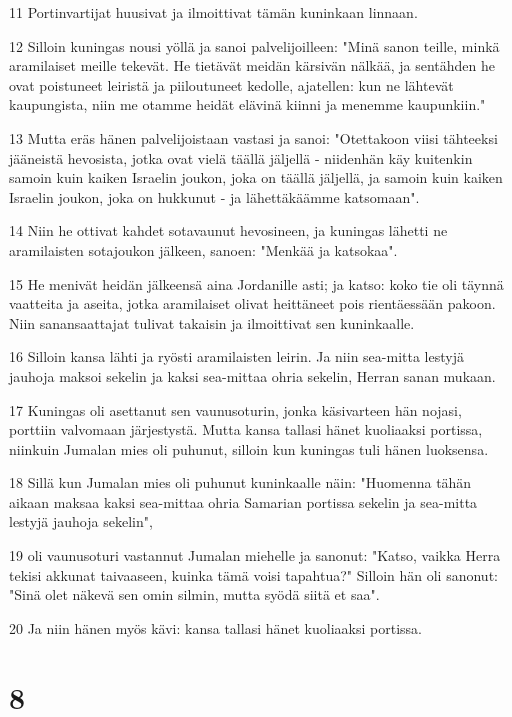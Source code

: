 \par 11 Portinvartijat huusivat ja ilmoittivat tämän kuninkaan linnaan.
\par 12 Silloin kuningas nousi yöllä ja sanoi palvelijoilleen: "Minä sanon teille, minkä aramilaiset meille tekevät. He tietävät meidän kärsivän nälkää, ja sentähden he ovat poistuneet leiristä ja piiloutuneet kedolle, ajatellen: kun ne lähtevät kaupungista, niin me otamme heidät elävinä kiinni ja menemme kaupunkiin."
\par 13 Mutta eräs hänen palvelijoistaan vastasi ja sanoi: "Otettakoon viisi tähteeksi jääneistä hevosista, jotka ovat vielä täällä jäljellä - niidenhän käy kuitenkin samoin kuin kaiken Israelin joukon, joka on täällä jäljellä, ja samoin kuin kaiken Israelin joukon, joka on hukkunut - ja lähettäkäämme katsomaan".
\par 14 Niin he ottivat kahdet sotavaunut hevosineen, ja kuningas lähetti ne aramilaisten sotajoukon jälkeen, sanoen: "Menkää ja katsokaa".
\par 15 He menivät heidän jälkeensä aina Jordanille asti; ja katso: koko tie oli täynnä vaatteita ja aseita, jotka aramilaiset olivat heittäneet pois rientäessään pakoon. Niin sanansaattajat tulivat takaisin ja ilmoittivat sen kuninkaalle.
\par 16 Silloin kansa lähti ja ryösti aramilaisten leirin. Ja niin sea-mitta lestyjä jauhoja maksoi sekelin ja kaksi sea-mittaa ohria sekelin, Herran sanan mukaan.
\par 17 Kuningas oli asettanut sen vaunusoturin, jonka käsivarteen hän nojasi, porttiin valvomaan järjestystä. Mutta kansa tallasi hänet kuoliaaksi portissa, niinkuin Jumalan mies oli puhunut, silloin kun kuningas tuli hänen luoksensa.
\par 18 Sillä kun Jumalan mies oli puhunut kuninkaalle näin: "Huomenna tähän aikaan maksaa kaksi sea-mittaa ohria Samarian portissa sekelin ja sea-mitta lestyjä jauhoja sekelin",
\par 19 oli vaunusoturi vastannut Jumalan miehelle ja sanonut: "Katso, vaikka Herra tekisi akkunat taivaaseen, kuinka tämä voisi tapahtua?" Silloin hän oli sanonut: "Sinä olet näkevä sen omin silmin, mutta syödä siitä et saa".
\par 20 Ja niin hänen myös kävi: kansa tallasi hänet kuoliaaksi portissa.

\chapter{8}

